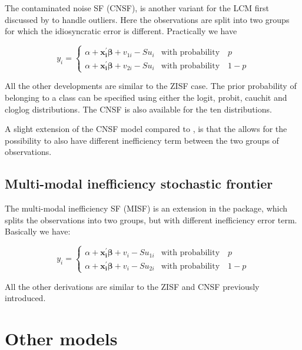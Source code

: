 \documentclass[nojss]{jss}
\begin{document}
The contaminated noise SF (CNSF), is another variant for the LCM first discussed 
by \citet{wheat19} to handle outliers. Here the observations are split into 
two groups for which the idiosyncratic error is different. Practically we have

\begin{equation}\label{eq:10}
y_i = \begin{cases}
\alpha + \mathbf{x_i^{\prime}}\bm{\beta} + 
 v_{1i} - Su_i & \text{with probability} \quad p \\
 \alpha + \mathbf{x_i^{\prime}}\bm{\beta} + 
v_{2i} - Su_i & \text{with probability} \quad 1-p
\end{cases}
\end{equation}

All the other developments are similar to the ZISF case. The prior probability
of belonging to a class can be specified using either the logit, probit, cauchit
and cloglog distributions. The CNSF is also available for the ten distributions.

A slight extension of the CNSF model compared to \citet{wheat19}, is that the 
 allows for the possibility to also have different inefficiency term 
between the two groups of observations.

\subsection{Multi-modal inefficiency stochastic frontier}

The multi-modal inefficiency SF (MISF) is an extension in the  package, 
which splits the observations into two groups, but with different inefficiency
error term. Basically we have:

\begin{equation}\label{eq:11}
y_i = \begin{cases}
\alpha + \mathbf{x_i^{\prime}}\bm{\beta} + 
 v_{i} - Su_{1i} & \text{with probability} \quad p \\
 \alpha + \mathbf{x_i^{\prime}}\bm{\beta} + 
v_{i} - Su_{2i} & \text{with probability} \quad 1-p
\end{cases}
\end{equation}

All the other derivations are similar to the ZISF and CNSF previously introduced.

\section{Other models} \label{sec:other}
\end{document}
